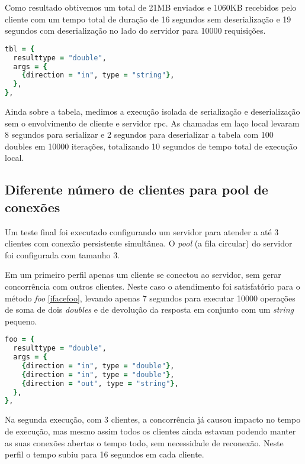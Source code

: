 \documentclass[11pt]{article}
\begin{document}
Como resultado obtivemos um total de 21MB enviados e 1060KB recebidos pelo
cliente com um tempo total de duração de 16 segundos sem deserialização e 19
segundos com deserialização no lado do servidor para 10000 requisições.

\begin{lstlisting}[label={ifacetbl},language=Ruby,caption=Interface tbl]
tbl = {
  resulttype = "double",
  args = {
    {direction = "in", type = "string"},
  },
},
\end{lstlisting}

Ainda sobre a tabela, medimos a execução isolada de serialização e
deserialização sem o envolvimento de cliente e servidor \gls{rpc}. As chamadas
em laço local levaram 8 segundos para serializar e 2 segundos para deserializar
a tabela com 100 doubles em 10000 iterações, totalizando 10 segundos de tempo
total de execução local.

\subsection{Diferente número de clientes para pool de conexões}\label{subsec:diffpool}

Um teste final foi executado configurando um servidor para atender a até 3
clientes com conexão persistente simultânea. O \textit{pool} (a fila circular)
do servidor foi configurada com tamanho 3.

Em um primeiro perfil apenas um cliente se conectou ao servidor, sem gerar
concorrência com outros clientes. Neste caso o atendimento foi satisfatório para
o método \textit{foo} \ref{ifacefoo}, levando apenas 7 segundos para executar
10000 operações de soma de dois \textit{doubles} e de devolução da resposta em
conjunto com um \textit{string} pequeno.

\begin{lstlisting}[label={ifacefoo},language=Ruby,caption=Interface foo]
foo = {
  resulttype = "double",
  args = {
    {direction = "in", type = "double"},
    {direction = "in", type = "double"},
    {direction = "out", type = "string"},
  },
},
\end{lstlisting}

Na segunda execução, com 3 clientes, a concorrência já causou impacto no tempo
de execução, mas mesmo assim todos os clientes ainda estavam podendo manter as
suas conexões abertas o tempo todo, sem necessidade de reconexão. Neste perfil o
tempo subiu para 16 segundos em cada cliente.
\end{document}

